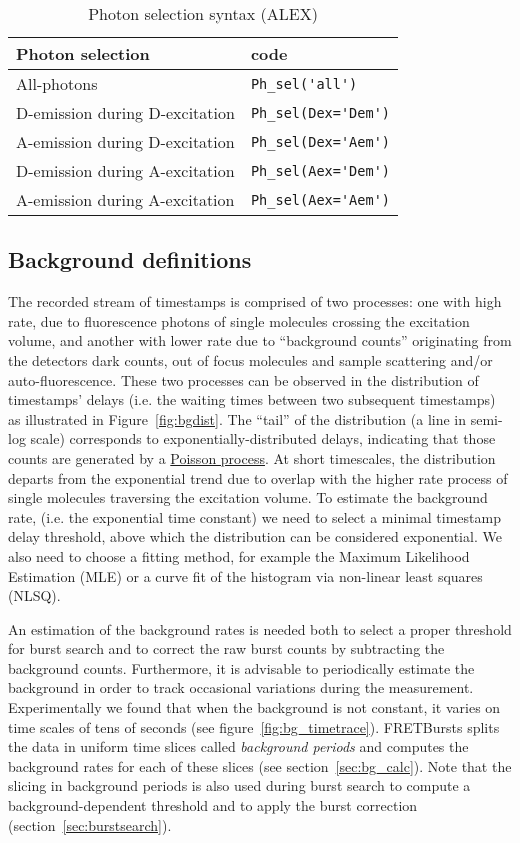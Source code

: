 \begin{table}
\begin{tabular}{l|l}
  Photon selection  & code \\
  \hline
  All-photons & \verb|Ph_sel('all')|\\
  D-emission during D-excitation & \verb|Ph_sel(Dex='Dem')|\\
  A-emission during D-excitation & \verb|Ph_sel(Dex='Aem')|\\
  D-emission during A-excitation & \verb|Ph_sel(Aex='Dem')|\\
  A-emission during A-excitation & \verb|Ph_sel(Aex='Aem')|\\
\end{tabular}
\caption{\label{tab:ph_sel_alex}Photon selection syntax (ALEX)}
\end{table}

\subsection{Background definitions}
\label{sec:bg_intro}

The recorded stream of timestamps is comprised of two processes: one with 
high rate, due to fluorescence photons of single molecules crossing the 
excitation volume, and another with lower rate due to “background
counts” originating from the detectors dark counts, out of focus molecules
and sample scattering and/or auto-fluorescence\cite{Gopich_2008}. 
These two processes can be 
observed in the distribution of timestamps' delays (i.e. the waiting times 
between two subsequent timestamps) as illustrated in Figure~\ref{fig:bgdist}.
The “tail” of the distribution (a line in semi-log scale) corresponds 
to exponentially-distributed delays, indicating that those counts are generated by a
\href{http://en.wikipedia.org/wiki/Poisson_process}{Poisson process}. At short
timescales, the distribution departs from the exponential trend due to overlap with the higher rate process of single molecules traversing the excitation volume. To estimate the background
rate, (i.e. the exponential time constant) we need to select a minimal
timestamp delay threshold, above which the distribution can be considered exponential. We also need to choose a fitting method, for example the Maximum
Likelihood Estimation (MLE) or a curve fit of the histogram via non-linear
least squares (NLSQ).

An estimation of the background rates is needed both to select a proper threshold for
burst search and to correct the raw burst counts by subtracting the background counts.
Furthermore, it is advisable to periodically estimate the background
in order to track occasional variations during the measurement. Experimentally
we found that when the background is not constant, it varies on time scales of tens of seconds 
(see figure~\ref{fig:bg_timetrace}). FRETBursts splits the data in uniform time
slices called \textit{background periods} and computes the background rates for
each of these slices (see section~\ref{sec:bg_calc}). Note that the slicing 
in background
periods is also used during burst search to compute a background-dependent
threshold and to apply the burst correction (section~\ref{sec:burstsearch}).

